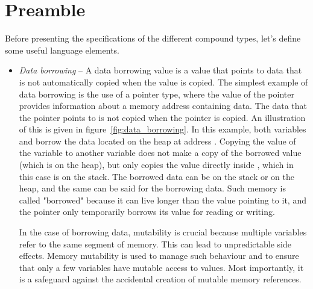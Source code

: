 \section{Preamble}%
\label{sec:preamble_compound_types}

Before presenting the specifications of the different compound types, let's
define some useful language elements.


\begin{itemize}
\item \textit{Data borrowing} -- A data borrowing value is a value that points
  to data that is not automatically copied when the value is copied. The
  simplest example of data borrowing is the use of a pointer type, where the
  value of the pointer provides information about a memory address containing
  data. The data that the pointer points to is not copied when the pointer is
  copied. An illustration of this is given in figure~\ref{fig:data_borrowing}.
  In this example, both variables  and  borrow the data
  located on the heap at address . Copying the value of the
  variable  to another variable does not make a copy of the borrowed
  value (which is on the heap), but only copies the value directly inside
  , which in this case is on the stack. The borrowed data can be on
  the stack or on the heap, and the same can be said for the borrowing data.
  Such memory is called "borrowed" because it can live longer than the value
  pointing to it, and the pointer only temporarily borrows its value for reading
  or writing.

  In the case of borrowing data, mutability is crucial because multiple variables
  refer to the same segment of memory. This can lead to unpredictable side
  effects. Memory mutability is used to manage such behaviour and to ensure that
  only a few variables have mutable access to values. Most importantly, it is a
  safeguard against the accidental creation of mutable memory references.


\end{itemize}

